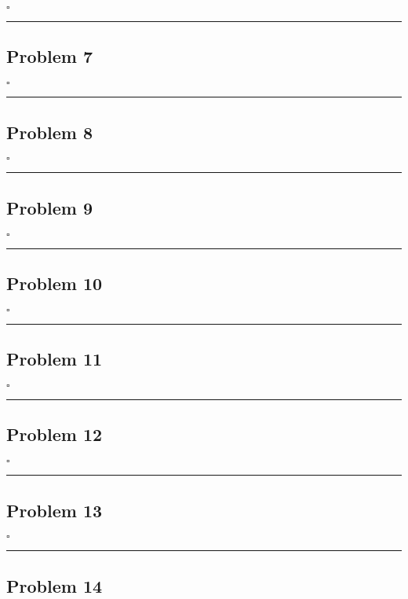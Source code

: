 \documentclass[12pt]{article}
\newcommand*{\QEDB}{\hfill\ensuremath{\square}}
\newcommand{\horrule}[1]{\rule{\linewidth}{#1}}
\begin{document}
\QEDB

\horrule{0.5pt}

\subsection*{Problem 7}

\QEDB

\horrule{0.5pt}

\subsection*{Problem 8}

\QEDB

\horrule{0.5pt}

\subsection*{Problem 9}

\QEDB

\horrule{0.5pt}

\subsection*{Problem 10}

\QEDB

\horrule{0.5pt}

\subsection*{Problem 11}

\QEDB

\horrule{0.5pt}

\subsection*{Problem 12}

\QEDB

\horrule{0.5pt}

\subsection*{Problem 13}

\QEDB

\horrule{0.5pt}

\subsection*{Problem 14}
\end{document}

